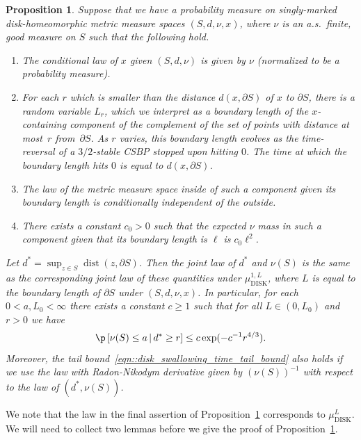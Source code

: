 \documentclass[JEP,XML,SOM,Unicode]{cedram}
\theoremstyle{plain}
\numberwithin{theorem}{section}
\newtheorem{proposition}[theorem]{Proposition}
\theoremstyle{definition}
\DeclareMathOperator{\dist}{dist}
\newcommand{\mudonel}{\mu_{ \mathrm{DISK}}^{1, L}}
\newcommand{\mudl}{\mu_{\mathrm{DISK}}^L}
\newcommand{\giv}{\,|\,}
\begin{document}
\begin{proposition}
\label{prop::disk_area_distance}
Suppose that we have a probability measure on singly-marked disk-homeomorphic metric measure spaces $(S,d,\nu,x)$, where $\nu$ is an a.s.\ finite, good measure on $S$ such that the following hold.
\begin{enumerate}
\item The conditional law of $x$ given $(S,d,\nu)$ is given by $\nu$ (normalized to be a probability measure).
\item For each $r$ which is smaller than the distance $d(x,\partial S)$ of $x$ to $\partial S$, there is a random variable $L_r$, which we interpret as a boundary length of the $x$-containing component of the complement of the set of points with distance at most~$r$ from~$\partial S$. As $r$ varies, this boundary length evolves as the time-reversal of a $3/2$-stable CSBP stopped upon hitting $0$. The time at which the boundary length hits $0$ is equal to $d(x,\partial S)$.
\item The law of the metric measure space inside of such a component given its boundary length is conditionally independent of the outside.
\item There exists a constant $c_0 > 0$ such that the expected $\nu$ mass in such a component given that its boundary length is $\ell$ is $c_0 \ell^2$.
\end{enumerate}
Let $d^* = \sup_{z \in S} \dist(z,\partial S)$. Then the joint law of $d^*$ and $\nu(S)$ is the same as the corresponding joint law of these quantities under $\mudonel$, where $L$ is equal to the boundary length of $\partial S$ under $(S,d,\nu,x)$. In particular, for each $0 < a,L_0 < \infty$ there exists a constant $c \geq 1$ such that for all $L \in (0,L_0)$ and $r > 0$ we have
\begin{equation}
\label{eqn::disk_swallowing_time_tail_bound}
\p\left[\nu(S) \leq a \giv d^* \geq r \right] \leq c\exp(- c^{-1} r^{4/3}).
\end{equation}
Moreover, the tail bound~\eqref{eqn::disk_swallowing_time_tail_bound} also holds if we use the law with Radon-Nikodym derivative given by $(\nu(S))^{-1}$ with respect to the law of $(d^*,\nu(S))$.
\end{proposition}

We note that the law in the final assertion of Proposition~\ref{prop::disk_area_distance} corresponds to $\mudl$. We will need to collect two lemmas before we give the proof of Proposition~\ref{prop::disk_area_distance}.
\end{document}
